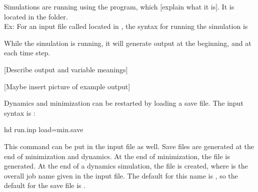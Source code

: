 Simulations are running using the  program, which [explain what it is]. It is located in the  folder. \\

Ex: For an input file called  located in , the syntax for running the simulation is \\

While the simulation is running, it will generate output at the beginning, and at each time step. 

[Describe output and variable meanings]

[Maybe insert picture of example output]



Dynamics and minimization can be restarted by loading a save file.
The input syntax is :
\begin{command}
hd run.inp load=min.save
\end{command}
This command can be put in the input file as well.
Save files are generated at the end of minimization and dynamics.
At the end of minimization, the file  is generated.
At the end of a dynamics simulation, the file  is created, where  is the overall job name given in the input file.
The default for this name is , so the default for the save file is .




